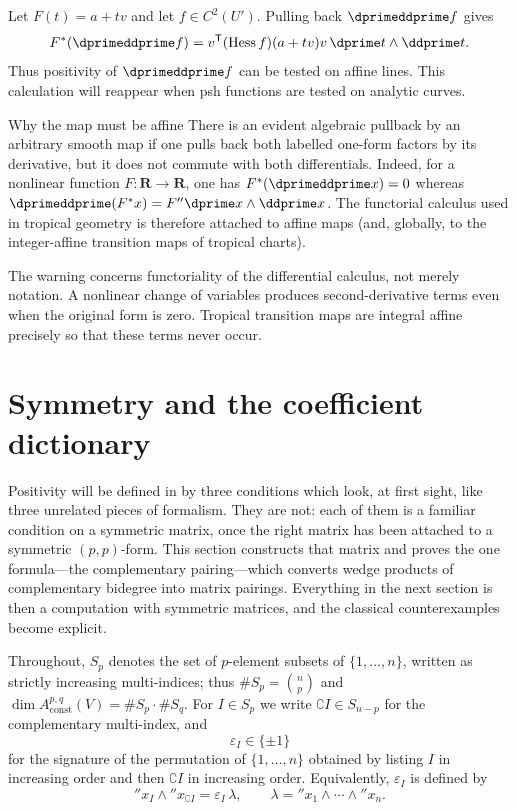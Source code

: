 \begin{example}
\label{ex:ch09-restriction-line}
Let $F(t)=a+tv$ and let $f\in C^2(U')$.  Pulling back
$\dprimeddprime f$ gives
\[
 F^*(\dprimeddprime f)
 =v^{\mathsf T}(\operatorname{Hess}f)(a+tv)v\,
   \dprime t\wedge\ddprime t.
\]
Thus positivity of $\dprimeddprime f$ can be tested on affine lines.  This
calculation will reappear when psh functions are tested on analytic curves.
\end{example}

\begin{warning}{Why the map must be affine}
There is an evident algebraic pullback by an arbitrary smooth map if one
pulls back both labelled one-form factors by its derivative, but it does not
commute with both differentials.  Indeed, for a nonlinear function
$F:\mathbf R\to\mathbf R$, one has
$F^*(\dprimeddprime x)=0$ whereas $\dprimeddprime(F^*x)=F''\dprime x\wedge \ddprime x$.
The functorial calculus used in tropical geometry is therefore attached to
affine maps (and, globally, to the integer-affine transition maps of
tropical charts).
\end{warning}

The warning concerns functoriality of the differential calculus, not merely
notation.  A nonlinear change of variables produces second-derivative terms
even when the original form is zero.  Tropical transition maps are integral
affine precisely so that these terms never occur.

\section{Symmetry and the coefficient dictionary}
\label{sec:ch09-symmetry}

Positivity will be defined in  by three conditions
which look, at first sight, like three unrelated pieces of formalism.  They
are not: each of them is a familiar condition on a symmetric matrix, once the
right matrix has been attached to a symmetric $(p,p)$-form.  This section
constructs that matrix and proves the one formula---the complementary
pairing---which converts wedge products of complementary bidegree into matrix
pairings.  Everything in the next section is then a computation with
symmetric matrices, and the classical counterexamples become explicit.

Throughout, $S_p$ denotes the set of $p$-element subsets of
$\{1,\ldots,n\}$, written as strictly increasing multi-indices; thus
$\#S_p=\binom np$ and
$\dim A_{\mathrm{const}}^{p,q}(V)=\#S_p\cdot\#S_q$.  For $I\in S_p$ we
write $\complement I\in S_{n-p}$ for the complementary multi-index, and
\[
 \varepsilon_I\in\{\pm1\}
\]
for the signature of the permutation of $\{1,\ldots,n\}$ obtained by listing
$I$ in increasing order and then $\complement I$ in increasing order.
Equivalently, $\varepsilon_I$ is defined by
\[
 \dprime x_I\wedge\dprime x_{\complement I}=\varepsilon_I\,\lambda,
 \qquad
 \lambda=\dprime x_1\wedge\cdots\wedge\dprime x_n .
\]

